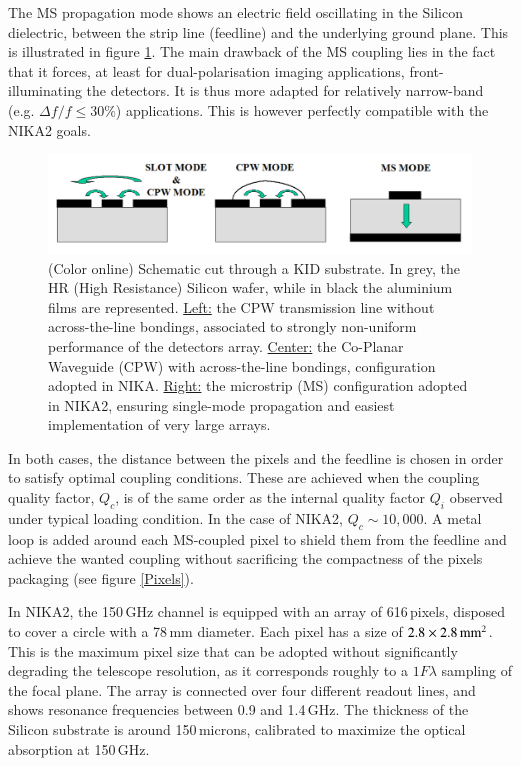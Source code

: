 \documentclass[]{aa} %
\begin{document}
The MS propagation mode shows an electric field oscillating in the Silicon dielectric, between the strip line (feedline) and the underlying ground plane. This is illustrated in figure \ref{CPWvsMS}. The main drawback of the MS coupling lies in the fact that it forces, at least for dual-polarisation imaging applications, front-illuminating the detectors. It is thus more adapted for relatively narrow-band (e.g. $\Delta f / f  \leq 30 \%$) applications. This is however perfectly compatible with the NIKA2 goals.  

\begin{figure}[h]
   \centering
    \includegraphics[width=.95\linewidth]{CPWvsMS.png}
      \caption{(Color online) Schematic cut through a KID substrate. In grey, the HR (High Resistance) Silicon wafer, while in black the aluminium films are represented. \underline{Left:} the CPW transmission line without across-the-line bondings, associated to strongly non-uniform performance of the detectors array. \underline{Center:} the Co-Planar Waveguide (CPW) with across-the-line bondings, configuration adopted in NIKA. \underline{Right:} the microstrip (MS) configuration adopted in NIKA2, ensuring single-mode propagation and easiest implementation of very large arrays.}
         \label{CPWvsMS}
\end{figure}

In both cases, the distance between the pixels and the feedline is chosen in order to satisfy optimal coupling conditions. These are achieved when the coupling quality factor, $Q_c$, is of the same order as the internal quality factor $Q_i$ observed under typical loading condition. In the case of NIKA2, $Q_c\sim10,000$. A metal loop is added around each MS-coupled pixel to shield them from the feedline and achieve the wanted coupling without sacrificing the compactness of the pixels packaging (see figure \ref{Pixels}). 

In NIKA2, the 150\,GHz channel is equipped with an array of 616\,pixels, disposed to cover a circle with a 78\,mm diameter. Each pixel has a size of $2.8\times2.8\textrm{\,mm}^2$. This is the maximum pixel size that can be adopted without significantly degrading the telescope resolution, as it corresponds roughly to a $1 F \lambda$ sampling of the focal plane. The array is connected over four different readout lines, and shows resonance frequencies between 0.9 and 1.4\,GHz. The thickness of the Silicon substrate is around 150\,microns, calibrated to maximize the optical absorption at 150\,GHz. 
\end{document}
